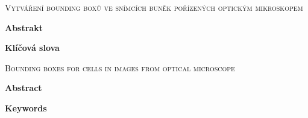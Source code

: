 \thispagestyle{empty}

\textsc{Vytváření bounding boxů ve snímcích buněk pořízených optickým mikroskopem}

\vspace{0.5cm}

\textbf{Abstrakt}

\textbf{Klíčová slova}

\vspace{0.7cm}

\textsc{Bounding boxes for cells in images from optical microscope}

\textbf{Abstract}

\textbf{Keywords}

\newpage
